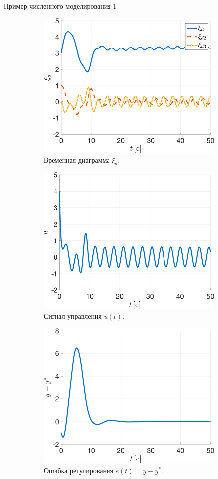 \begin{frame}{Пример численного моделирования  1} \hypertarget{slide\insertframenumber}{}
	\begin{figure}[!h]
		\begin{subfigure}[t]{0.45\textwidth}
			\centering
			\includegraphics[width=0.5\linewidth]{figures/3.1xid.png}
			\caption{Временная диаграмма  $\xi_d$.}
		\end{subfigure}
		\begin{subfigure}[t]{0.45\textwidth}
			\centering
			\includegraphics[width=0.5\linewidth]{figures/3.1u.png}
			\caption{Сигнал управления $u(t)$.}
		\end{subfigure}
		\begin{subfigure}[t]{0.45\textwidth}
			\centering
			\includegraphics[width=0.5\linewidth]{figures/3.1ey.png}
			\caption{Ошибка регулирования $e(t)=y-y^*$.}
		\end{subfigure}
		\begin{subfigure}[t]{0.45\textwidth}

\end{subfigure}
\end{figure}
\end{frame}
